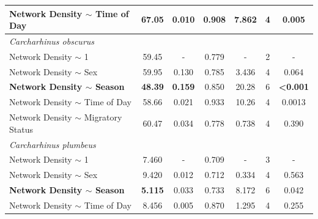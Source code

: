 \documentclass[11pt,a4paper]{article}
\begin{document}
\begin{table}[h!]
\begin{tabular}{@{}lcccccc@{}}
			Network Density $\sim$ Time of Day      & 67.05        & 0.010        & 0.908        & 7.862         & 4           & 0.005           \\ \midrule
			\textit{Carcharhinus obscurus}         &              &              &              &               &             &                 \\
			Network Density $\sim$ 1 & 59.45 & -  & 0.779 & - & 2 & - \\
			Network Density $\sim$ Sex              & 59.95        & 0.130        & 0.785        & 3.436         & 4           & 0.064           \\
			\textbf{Network Density $\sim$ Season}           & \textbf{48.39}        & \textbf{0.159}        & 0.850        & 20.28         & 6           & \textbf{\textless 0.001} \\
			Network Density $\sim$ Time of Day      & 58.66        & 0.021        & 0.933        & 10.26         & 4           & 0.0013          \\
			Network Density $\sim$ Migratory Status & 60.47        & 0.034        & 0.778        & 0.738         & 4           & 0.390           \\ \midrule
			\textit{Carcharhinus plumbeus}         &              &              &              &               &             &                 \\
			Network Density $\sim$ 1 & 7.460 & -  & 0.709 & - & 3 & - \\
			Network Density $\sim$ Sex              & 9.420        & 0.012        & 0.712        & 0.334         & 4           & 0.563           \\
			\textbf{Network Density $\sim$ Season}           & \textbf{5.115}        & 0.033        & 0.733        & 8.172         & 6           & 0.042           \\
			Network Density $\sim$ Time of Day      & 8.456        & 0.005        & 0.870        & 1.295         & 4           & 0.255           \\ \bottomrule
		\end{tabular}
		\label{network_outputs}
	\end{table}
	
	\newpage
	
\end{document}
